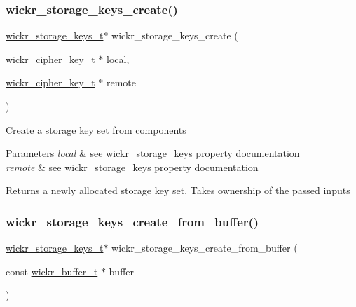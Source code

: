 \subsubsection{\texorpdfstring{wickr\+\_\+storage\+\_\+keys\+\_\+create()}{wickr\_storage\_keys\_create()}}
{\footnotesize\ttfamily \mbox{\hyperlink{structwickr__storage__keys}{wickr\+\_\+storage\+\_\+keys\+\_\+t}}$\ast$ wickr\+\_\+storage\+\_\+keys\+\_\+create (\begin{DoxyParamCaption}\item[{\mbox{\hyperlink{structwickr__cipher__key}{wickr\+\_\+cipher\+\_\+key\+\_\+t}} $\ast$}]{local,  }\item[{\mbox{\hyperlink{structwickr__cipher__key}{wickr\+\_\+cipher\+\_\+key\+\_\+t}} $\ast$}]{remote }\end{DoxyParamCaption})}

Create a storage key set from components


\begin{DoxyParams}{Parameters}
{\em local} & see \textquotesingle{}\mbox{\hyperlink{structwickr__storage__keys}{wickr\+\_\+storage\+\_\+keys}}\textquotesingle{} property documentation \\
\hline
{\em remote} & see \textquotesingle{}\mbox{\hyperlink{structwickr__storage__keys}{wickr\+\_\+storage\+\_\+keys}}\textquotesingle{} property documentation \\
\hline
\end{DoxyParams}
\begin{DoxyReturn}{Returns}
a newly allocated storage key set. Takes ownership of the passed inputs 
\end{DoxyReturn}
\mbox{\label{group__wickr__storage__keys_gae5631d93182e635fb7f48269eb3f1723}} 
\subsubsection{\texorpdfstring{wickr\+\_\+storage\+\_\+keys\+\_\+create\+\_\+from\+\_\+buffer()}{wickr\_storage\_keys\_create\_from\_buffer()}}
{\footnotesize\ttfamily \mbox{\hyperlink{structwickr__storage__keys}{wickr\+\_\+storage\+\_\+keys\+\_\+t}}$\ast$ wickr\+\_\+storage\+\_\+keys\+\_\+create\+\_\+from\+\_\+buffer (\begin{DoxyParamCaption}\item[{const \mbox{\hyperlink{structwickr__buffer}{wickr\+\_\+buffer\+\_\+t}} $\ast$}]{buffer }\end{DoxyParamCaption})}

